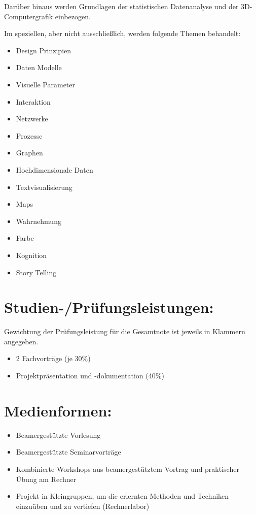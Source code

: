 Darüber hinaus werden Grundlagen der statistischen Datenanalyse und der
3D-Computergrafik einbezogen.

Im speziellen, aber nicht ausschließlich, werden folgende Themen
behandelt:

\begin{itemize}
\tightlist
\item
  Design Prinzipien
\item
  Daten Modelle
\item
  Visuelle Parameter
\item
  Interaktion
\item
  Netzwerke
\item
  Prozesse
\item
  Graphen
\item
  Hochdimensionale Daten
\item
  Textvisualisierung
\item
  Maps
\item
  Wahrnehmung
\item
  Farbe
\item
  Kognition
\item
  Story Telling
\end{itemize}

\section*{Studien-/Prüfungsleistungen:}\label{studien-pruxfcfungsleistungen-18}

Gewichtung der Prüfungsleistung für die Gesamtnote ist jeweils in
Klammern angegeben.

\begin{itemize}
\tightlist
\item
  2 Fachvorträge (je 30\%)
\item
  Projektpräsentation und -dokumentation (40\%)
\end{itemize}

\section*{Medienformen:}\label{medienformen-18}

\begin{itemize}
\tightlist
\item
  Beamergestützte Vorlesung
\item
  Beamergestützte Seminarvorträge
\item
  Kombinierte Workshops aus beamergestütztem Vortrag und praktischer
  Übung am Rechner
\item
  Projekt in Kleingruppen, um die erlernten Methoden und Techniken
  einzuüben und zu vertiefen (Rechnerlabor)
\end{itemize}

